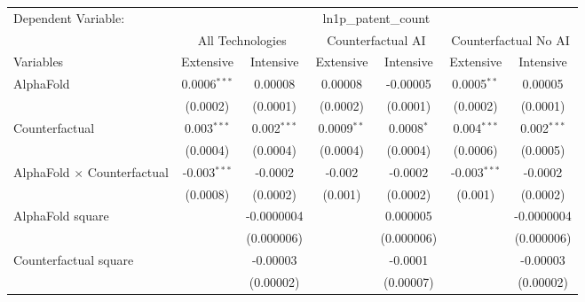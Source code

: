\begingroup
\centering
\begin{tabular}{lcccccc}
   \tabularnewline \midrule \midrule
   Dependent Variable: & \multicolumn{6}{c}{ln1p\_patent\_count}\\
 & \multicolumn{2}{c}{All Technologies} & \multicolumn{2}{c}{Counterfactual AI} & \multicolumn{2}{c}{Counterfactual No AI} \\
\cmidrule(lr){1-1}\cmidrule(lr){2-3} \cmidrule(lr){4-5} \cmidrule(lr){6-7}
Variables & \multicolumn{1}{c}{Extensive} & \multicolumn{1}{c}{Intensive} & \multicolumn{1}{c}{Extensive} & \multicolumn{1}{c}{Intensive} & \multicolumn{1}{c}{Extensive} & \multicolumn{1}{c}{Intensive} \\
\cmidrule(lr){1-1}\cmidrule(lr){2-2} \cmidrule(lr){3-3} \cmidrule(lr){4-4} \cmidrule(lr){5-5} \cmidrule(lr){6-6} \cmidrule(lr){7-7}
   AlphaFold                          & 0.0006$^{***}$ & 0.00008       & 0.00008       & -0.00005     & 0.0005$^{**}$  & 0.00005\\   
                                      & (0.0002)       & (0.0001)      & (0.0002)      & (0.0001)     & (0.0002)       & (0.0001)\\   
   Counterfactual                     & 0.003$^{***}$  & 0.002$^{***}$ & 0.0009$^{**}$ & 0.0008$^{*}$ & 0.004$^{***}$  & 0.002$^{***}$\\   
                                      & (0.0004)       & (0.0004)      & (0.0004)      & (0.0004)     & (0.0006)       & (0.0005)\\   
   AlphaFold $\times$ Counterfactual  & -0.003$^{***}$ & -0.0002       & -0.002        & -0.0002      & -0.003$^{***}$ & -0.0002\\   
                                      & (0.0008)       & (0.0002)      & (0.001)       & (0.0002)     & (0.001)        & (0.0002)\\   
   AlphaFold square                   &                & -0.0000004    &               & 0.000005     &                & -0.0000004\\   
                                      &                & (0.000006)    &               & (0.000006)   &                & (0.000006)\\   
   Counterfactual square              &                & -0.00003      &               & -0.0001      &                & -0.00003\\   
                                      &                & (0.00002)     &               & (0.00007)    &                & (0.00002)\\   

\end{tabular}
